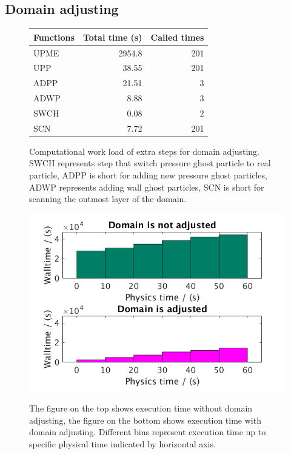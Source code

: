 \documentclass[procedia]{easychair}
\begin{document}
\subsection{Domain adjusting}
\begin{figure}
\CenterFloatBoxes
\begin{floatrow}
\ttabbox
{	  
    \begin{tabular}{lrr}
    \hline
    Functions & Total time (s) & Called times\\
    	\hline
    UPME & 2954.8 & 201 \\
    UPP & 38.55 &  201 \\
    ADPP & 21.51 & 3 \\
    ADWP  & 8.88 & 3 \\
    SWCH & 0.08 &  2 \\
    SCN  & 7.72 & 201 \\
    \hline
  \end{tabular}
}
{\caption{Computational work load of extra steps for domain adjusting. SWCH represents step that switch pressure ghost particle to real particle, ADPP is short for adding new pressure ghost particles, ADWP represents adding wall ghost particles, SCN is short for scanning the outmost layer of the domain.}
\label{tab:Computational_cost_doamin_adj}}
\killfloatstyle
\ffigbox
{\includegraphics[scale=0.35]{adj_vs_no}}
{\caption{The figure on the top shows execution time without domain adjusting, the figure on the bottom shows execution time with domain adjusting. Different bins represent execution time up to specific physical time indicated by horizontal axis.}
\label{fig:adj_vs_no}}
\end{floatrow}
\end{figure}
\end{document}
